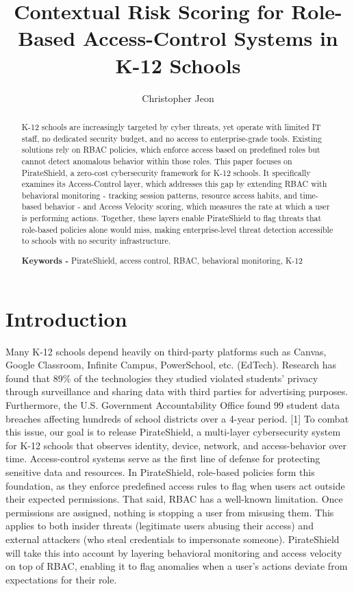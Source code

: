 \documentclass[twocolumn]{article}
\title{{\normalfont Contextual Risk Scoring for Role-Based Access-Control Systems in K-12 Schools}}
\author[1]{\small Christopher Jeon}
\affil{\small Department of Mathematics and Computer Science 

Seton Hall University, USA

\href{mailto:you@university.edu}{jeonchri@shu.edu}}
\date{}
\begin{document}
\maketitle

\begin{abstract}
 K-12 schools are increasingly targeted by cyber threats, yet operate with limited IT staff, no dedicated security budget, and no access to enterprise-grade tools. Existing solutions rely on RBAC policies, which enforce access based on predefined roles but cannot detect anomalous behavior within those roles. This paper focuses on PirateShield, a zero-cost cybersecurity framework for K-12 schools. It specifically examines its Access-Control layer, which addresses this gap by extending RBAC with behavioral monitoring - tracking session patterns, resource access habits, and time-based behavior - and Access Velocity scoring, which measures the rate at which a user is performing actions. Together, these layers enable PirateShield to flag threats that role-based policies alone would miss, making enterprise-level threat detection accessible to schools with no security infrastructure.

{\textbf{Keywords -}} PirateShield, access control, RBAC, behavioral monitoring, K-12
\end{abstract}
\section{Introduction}
Many K-12 schools depend heavily on third-party platforms such as Canvas, Google Classroom, Infinite Campus, PowerSchool, etc. (EdTech). Research has found that 89\% of the technologies they studied violated students' privacy through surveillance and sharing data with third parties for advertising purposes. Furthermore, the U.S. Government Accountability Office found 99 student data breaches affecting hundreds of school districts over a 4-year period. [1] To combat this issue, our goal is to release PirateShield, a multi-layer cybersecurity system for K-12 schools that observes identity, device, network, and access-behavior over time. Access-control systems serve as the first line of defense for protecting sensitive data and resources. In PirateShield, role-based policies form this foundation, as they enforce predefined access rules to flag when users act outside their expected permissions. That said, RBAC has a well-known limitation. Once permissions are assigned, nothing is stopping a user from misusing them. This applies to both insider threats (legitimate users abusing their access) and external attackers (who steal credentials to impersonate someone). PirateShield will take this into account by layering behavioral monitoring and access velocity on top of RBAC, enabling it to flag anomalies when a user's actions deviate from expectations for their role.
\end{document}
